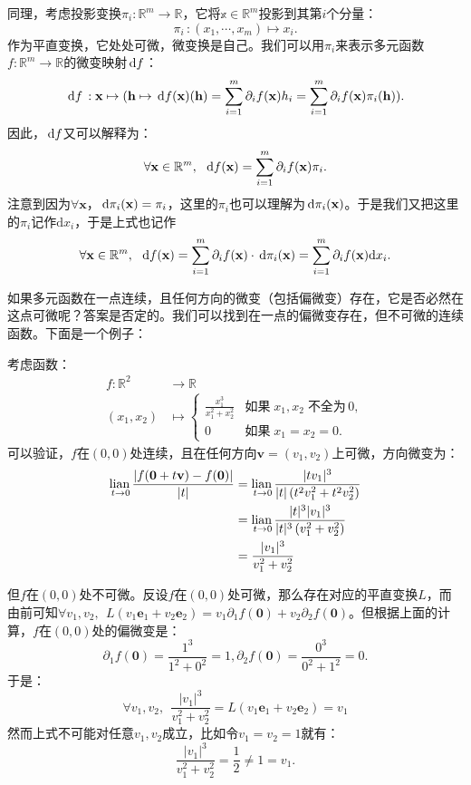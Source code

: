 \documentclass[12pt,UTF8,fontset=none]{ctexbook}
\begin{document}
同理，考虑投影变换$\pi_i:\mathbb{R}^m\rightarrow\mathbb{R}$，它将$\mathbb{x}\in\mathbb{R}^m$投影到其第$i$个分量：
$$ \pi_i \, : (x_1,\cdots,x_m) \mapsto x_i. $$
作为平直变换，它处处可微，微变换是自己。我们可以用$\pi_i$来表示多元函数$f:\mathbb{R}^m\to\mathbb{R}$的微变映射$\,\mathrm{d} f$：
$$ \,\mathrm{d} f \,: \mathbf{x} \mapsto (\mathbf{h}\mapsto \,\mathrm{d} f(\mathbf{x})(\mathbf{h}) = \sum_{i=1}^m \partial_i f(\mathbf{x}) h_i = \sum_{i=1}^m \partial_i f(\mathbf{x}) \pi_i(\mathbf{h})). $$
因此，$\,\mathrm{d} f$又可以解释为：
$$ \forall \mathbf{x}\in\mathbb{R}^m, \,\,\,\,\mathrm{d} f(\mathbf{x}) = \sum_{i=1}^m\partial_i f(\mathbf{x}) \pi_i. $$
注意到因为$\forall \mathbf{x}$，$\,\mathrm{d} \pi_i(\mathbf{x}) = \pi_i$，这里的$\pi_i$也可以理解为$\,\mathrm{d} \pi_i(\mathbf{x})$。于是我们又把这里的$\pi_i$记作$\mathrm{d}x_i$，于是上式也记作
$$ \forall \mathbf{x}\in\mathbb{R}^m, \,\,\,\,\mathrm{d} f(\mathbf{x}) = \sum_{i=1}^m\partial_i f(\mathbf{x})\cdot \,\mathrm{d} \pi_i(\mathbf{x}) = \sum_{i=1}^m\partial_i f(\mathbf{x}) \mathrm{d}x_i. $$

如果多元函数在一点连续，且任何方向的微变（包括偏微变）存在，它是否必然在这点可微呢？答案是否定的。我们可以找到在一点的偏微变存在，但不可微的连续函数。下面是一个例子：

考虑函数：
\begin{align*}
    f: \mathbb{R}^2 &\rightarrow \mathbb{R} \\
    (x_1, x_2) &\mapsto \begin{cases}
        \displaystyle\frac{x_1^3}{x_1^2 + x_2^2} & \mbox{如果}\; x_1, x_2\; \mbox{不全为}\, 0,\\
        0 & \mbox{如果}\; x_1 = x_2 = 0.
    \end{cases}
\end{align*}
可以验证，$f$在$(0,0)$处连续，且在任何方向$\mathbf{v} = (v_1, v_2)$上可微，方向微变为：
\begin{align*}
    \underset{t\to 0}{\operatorname{lian}\,} \frac{\left|f(\mathbf{0} + t\mathbf{v}) - f(\mathbf{0})\right|}{|t|} &= \underset{t\to 0}{\operatorname{lian}\,} \frac{|tv_1|^3}{|t|\left(t^2v_1^2 + t^2v_2^2\right)} \\
    &= \underset{t\to 0}{\operatorname{lian}\,} \frac{|t|^3|v_1|^3}{|t|^3\left(v_1^2 + v_2^2\right)} \\
    &= \frac{|v_1|^3}{v_1^2 + v_2^2}
\end{align*}

但$f$在$(0,0)$处不可微。反设$f$在$(0,0)$处可微，那么存在对应的平直变换$L$，而由前可知$\forall v_1, v_2,\;\,L(v_1 \mathbf{e}_1 + v_2 \mathbf{e}_2) = v_1 \partial_{1} f(\mathbf{0}) + v_2 \partial_{2} f(\mathbf{0}) $。但根据上面的计算，$f$在$(0,0)$处的偏微变是：
$$ \partial_{1} f(\mathbf{0}) = \frac{1^3}{1^2 + 0^2} = 1, \partial_{2} f(\mathbf{0}) = \frac{0^3}{0^2 + 1^2} = 0. $$
于是：
$$\forall v_1, v_2,\;\, \frac{|v_1|^3}{v_1^2 + v_2^2} = L(v_1 \mathbf{e}_1 + v_2 \mathbf{e}_2) = v_1 $$
然而上式不可能对任意$v_1, v_2$成立，比如令$v_1=v_2 = 1$就有：
$$ \frac{|v_1|^3}{v_1^2 + v_2^2} = \frac{1}{2} \neq 1 = v_1. $$
\end{document}
